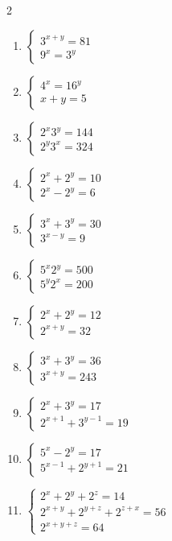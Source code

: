 \documentclass[12pt,a4paper]{article}
\begin{document}
\begin{multicols}{2}
\begin{enumerate}[leftmargin=*, itemsep=6pt]
\item \(\begin{cases}3^{x+y}=81\\ 9^x=3^y\end{cases}\)

\item \(\begin{cases}4^x=16^y\\ x+y=5\end{cases}\)

\item \(\begin{cases}2^x3^y=144\\ 2^y3^x=324\end{cases}\)

\item \(\begin{cases}2^x+2^y=10\\ 2^x-2^y=6\end{cases}\)

\item \(\begin{cases}3^x+3^y=30\\ 3^{x-y}=9\end{cases}\)

\item \(\begin{cases}5^x2^y=500\\ 5^y2^x=200\end{cases}\)

\item \(\begin{cases}2^x+2^y=12\\ 2^{x+y}=32\end{cases}\)

\item \(\begin{cases}3^x+3^y=36\\ 3^{x+y}=243\end{cases}\)

\item \(\begin{cases}2^x+3^y=17\\ 2^{x+1}+3^{y-1}=19\end{cases}\)

\item \(\begin{cases}5^x-2^y=17\\ 5^{x-1}+2^{y+1}=21\end{cases}\)

\item \(\begin{cases}2^x+2^y+2^z=14\\ 2^{x+y}+2^{y+z}+2^{z+x}=56\\ 2^{x+y+z}=64\end{cases}\)

\end{enumerate}
\end{multicols}
\newpage
\end{document}
